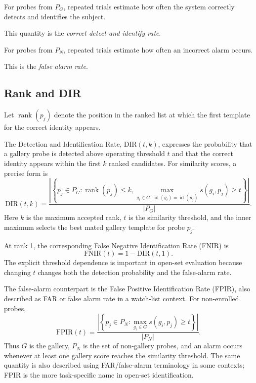 \documentclass[11pt,a4paper,oneside]{report}
\newcommand{\id}{\operatorname{id}}
\newcommand{\rankop}{\operatorname{rank}}
\begin{document}
For probes from \(P_G\), repeated trials estimate how often the system
correctly detects and identifies the subject.

This quantity is the \emph{correct detect and identify rate}.

For probes from \(P_N\), repeated trials estimate how often an incorrect
alarm occurs.

This is the \emph{false alarm rate}.

\subsection{Rank and DIR}

Let \(\rankop(p_j)\) denote the position in the ranked list at which the first template for
the correct identity appears.

The Detection and Identification Rate, \(\mathrm{DIR}(t,k)\), expresses the
probability that a gallery probe is detected above operating threshold \(t\)
and that the correct identity appears within the first \(k\) ranked candidates.
For similarity scores, a precise form is
\begin{equation}
\mathrm{DIR}(t,k)
=
\frac{
\left|
\left\{
 p_j\in P_G:
 \rankop(p_j)\le k,
 \max_{g_i\in G:\,\id(g_i)=\id(p_j)} s(g_i,p_j)\ge t
\right\}
\right|
}{|P_G|}.
\label{eq:dir}
\end{equation}
Here \(k\) is the maximum accepted rank, \(t\) is the similarity threshold,
and the inner maximum selects the best mated gallery template for probe \(p_j\).

At rank 1, the corresponding False Negative Identification Rate (FNIR) is
\begin{equation}
\mathrm{FNIR}(t)
=
1-\mathrm{DIR}(t,1).
\label{eq:fnir}
\end{equation}
The explicit threshold dependence is important in open-set evaluation because
changing \(t\) changes both the detection probability and the false-alarm rate.

The false-alarm counterpart is the False Positive Identification Rate
(FPIR), also described as FAR or false alarm rate in a watch-list context. For
non-enrolled probes,
\begin{equation}
\mathrm{FPIR}(t)
=
\frac{
\left|
\left\{
 p_j\in P_N:
 \max_{g_i\in G}s(g_i,p_j)\ge t
\right\}
\right|
}{|P_N|}.
\label{eq:fpir}
\end{equation}
Thus \(G\) is the gallery, \(P_N\) is the set of non-gallery probes, and an
alarm occurs whenever at least one gallery score reaches the similarity
threshold. The same quantity is also described using FAR/false-alarm terminology in some
contexts; FPIR is the more task-specific name in open-set identification.
\end{document}
